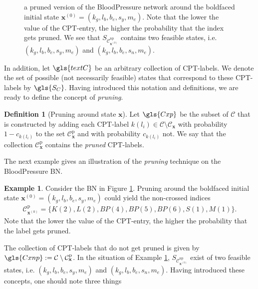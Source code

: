 \documentclass[a4paper, twoside, 11pt]{report}
\newcommand{\bfx}{{\mathbf{x}}}
\newcommand{\C}{{\mathcal C}}
\theoremstyle{plain}
\theoremstyle{definition}
\newtheorem{definition}[thm]{Definition}
\newtheorem{example}[thm]{Example}
\theoremstyle{remark}
\begin{document}
\begin{figure}[t!]
\begin{adjustbox}{width=\textwidth}
\end{adjustbox}
\caption{a pruned version of the BloodPressure network around the boldfaced initial state $\bfx^{(0)} = (k_g, l_b, b_e, s_y, m_e)$. Note that the lower the value of the CPT-entry, the higher the probability that the index gets pruned. We see that $S_{\C_{\bfx^{(0)}}^{\text{np}}}$ contains two feasible states, i.e. $(k_g, l_b, b_e, s_y, m_e)$ and $(k_g, l_b, b_e, s_n, m_e)$.}
\label{pruning}
\end{figure}
In addition, let $\gls{textC}$ be an arbitrary collection of CPT-labels. We denote the set of possible (not necessarily feasible) states that correspond to these CPT-labels by $\gls{S_C}$. Having introduced this notation and definitions, we are ready to define the concept of \textit{pruning}.
\begin{definition}[Pruning around state $\bfx$]\label{prunedef}
Let $\gls{Cxp}$ be the subset of $\C$ that is constructed by adding each CPT-label $k(l_i) \in \C \setminus \C_{\bfx}$ with probability $1-c_{k(l_i)}$ to the set $\C_\bfx^{\text{p}}$ and with probability $c_{k(l_i)}$ not. We say that the collection $\C_\bfx^{\text{p}}$ contains the \textit{pruned} CPT-labels. 
\end{definition}
The next example gives an illustration of the \textit{pruning} technique on the BloodPressure BN.
\begin{example}\label{ex:pruning}
Consider the BN in Figure \ref{pruning}. Pruning around the boldfaced initial state $\bfx^{(0)} = (k_g, l_b, b_e, s_y, m_e)$ could yield the non-crossed indices 
\begin{align*}
\C_{\bfx^{(0)}}^{\text{p}} = \{ K(2), L(2), BP(4), BP(5), BP(6), S(1), M(1) \}.
\end{align*}
Note that the lower the value of the CPT-entry, the higher the probability that the label gets pruned. 
\end{example}
The collection of CPT-labels that do not get pruned is given by $\gls{Cxnp}:=\C \setminus \C_\bfx^{\text{p}}$. In the situation of Example \ref{ex:pruning}, $S_{\C_{\bfx^{(0)}}^{\text{np}}}$ exist of two feasible states, i.e. $(k_g, l_b, b_e, s_y, m_e)$ and $(k_g, l_b, b_e, s_n, m_e)$. Having introduced these concepts, one should note three things
\end{document}
